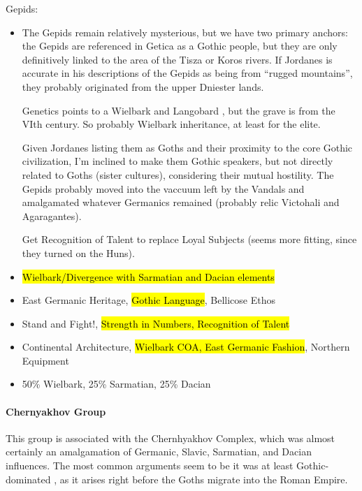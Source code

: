 \documentclass{article}
\begin{document}
	Gepids:
	\begin{itemize}
		\item The Gepids remain relatively mysterious, but we have two primary anchors:  the Gepids are referenced in Getica as a Gothic people, but they are only definitively linked to the area of the Tisza or Koros rivers. If Jordanes is accurate in his descriptions of the Gepids as being from “rugged mountains”, they probably originated from the upper Dniester lands.
		
		Genetics points to a Wielbark and Langobard \cite{GepidGenetics}, but the grave is from the VIth century. So probably Wielbark inheritance, at least for the elite.
		
		Given Jordanes listing them as Goths and their proximity to the core Gothic civilization, I’m inclined to make them Gothic speakers, but not directly related to Goths (sister cultures), considering their mutual hostility. The Gepids probably moved into the vaccuum left by the Vandals and amalgamated whatever Germanics remained (probably relic Victohali and Agaragantes).
		
		Get Recognition of Talent to replace Loyal Subjects (seems more fitting, since they turned on the Huns).
		\item \hl{Wielbark/Divergence with Sarmatian and Dacian elements}
		\item East Germanic Heritage, \hl{Gothic Language}, Bellicose Ethos
		\item Stand and Fight!, \hl{Strength in Numbers, Recognition of Talent}
		\item Continental Architecture, \hl{Wielbark COA, East Germanic Fashion}, Northern Equipment
		\item 50\% Wielbark, 25\% Sarmatian, 25\% Dacian
	\end{itemize}
	
	\paragraph{Chernyakhov Group}
	This group is associated with the Chernhyakhov Complex, which was almost certainly an amalgamation of Germanic, Slavic, Sarmatian, and Dacian influences.
	The most common arguments seem to be it was at least Gothic-dominated \cite{HeatherEmpiresAndBarbarians}, as it arises right before the Goths migrate into the Roman Empire.
	
\end{document}
